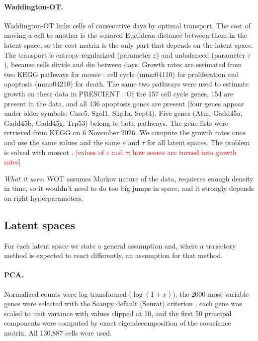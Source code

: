 \documentclass[12pt,a4paper]{article}
\newcommand{\todo}[1]{\textcolor{red}{[#1]}}
\begin{document}
\paragraph{Waddington-OT.}
Waddington-OT \cite{schiebinger2019optimal} links cells of consecutive days by optimal transport.
The cost of moving a cell to another is the squared Euclidean distance between them in the
latent space, so the cost matrix is the only part that depends on the latent space. The
transport is entropy-regularized (parameter $\varepsilon$) and unbalanced (parameter $\tau$),
because cells divide and die between days. Growth rates are estimated from two KEGG pathways
for mouse \cite{kanehisa2000kegg}: cell cycle (mmu04110) for proliferation and apoptosis
(mmu04210) for death. The same two pathways were used to estimate growth on these data in
PRESCIENT \cite{yeo2021prescient}. Of the 157 cell cycle genes, 154 are present in the data, and
all 136 apoptosis genes are present (four genes appear under older symbols: Casc5, Sgol1, Skp1a,
Sept4). Five genes (Atm, Gadd45a, Gadd45b, Gadd45g, Trp53) belong to both pathways. The gene
lists were retrieved from KEGG on 6 November 2026. We compute the growth rates once and use the same values and the same $\varepsilon$ and
$\tau$ for all latent spaces. The problem is solved with moscot \cite{klein2025moscot}.
\todo{values of $\varepsilon$ and $\tau$; how scores are turned into growth rates}

\emph{What it uses.} 
WOT assumes Markov nature of the data, requieres enough density in time, so it wouldn't need to do too big 
jumps in space, and it strongly depends on right hyperparameters.

\subsection{Latent spaces}
\label{sec:latent}
For each latent space we state a general assumption and, where a trajectory method is expected to
react differently, an assumption for that method.

\paragraph{PCA.}
Normalized counts were log-transformed ($\log(1+x)$), the 2000 most variable genes were
selected with the Scanpy default (Seurat) criterion \cite{wolf2018scanpy}, each gene was scaled
to unit variance with values clipped at 10, and the first 50 principal components were
computed by exact eigendecomposition of the covariance matrix. All 130{,}887 cells were used.
\end{document}
